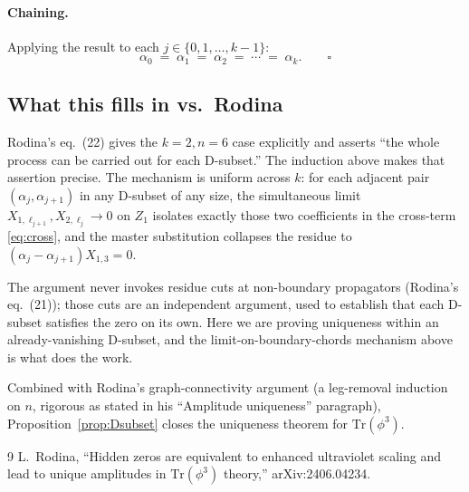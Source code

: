 \documentclass[11pt]{article}
\theoremstyle{definition}
\newcommand{\Tr}{\mathrm{Tr}}
\begin{document}
\paragraph{Chaining.} Applying the result to each $j \in \{0, 1, \dots, k-1\}$:
\[
\alpha_0 \;=\; \alpha_1 \;=\; \alpha_2 \;=\; \cdots \;=\; \alpha_k. \qquad\square
\]

\subsection{What this fills in vs.\ Rodina}

Rodina's eq.~(22) gives the $k=2, n=6$ case explicitly and asserts ``the whole process can be carried out for each D-subset.'' The induction above makes that assertion precise. The mechanism is uniform across $k$: for each adjacent pair $(\alpha_j, \alpha_{j+1})$ in any D-subset of any size, the simultaneous limit $X_{1,\ell_{j+1}}, X_{2,\ell_j} \to 0$ on $Z_1$ isolates exactly those two coefficients in the cross-term \eqref{eq:cross}, and the master substitution collapses the residue to $(\alpha_j - \alpha_{j+1}) X_{1,3} = 0$.

The argument never invokes residue cuts at non-boundary propagators (Rodina's eq.~(21)); those cuts are an independent argument, used to establish that each D-subset satisfies the zero on its own. Here we are proving uniqueness within an already-vanishing D-subset, and the limit-on-boundary-chords mechanism above is what does the work.

Combined with Rodina's graph-connectivity argument (a leg-removal induction on $n$, rigorous as stated in his ``Amplitude uniqueness'' paragraph), Proposition~\ref{prop:Dsubset} closes the uniqueness theorem for $\Tr(\phi^3)$.

\begin{thebibliography}{9}
 L.~Rodina, ``Hidden zeros are equivalent to enhanced ultraviolet scaling and lead to unique amplitudes in $\Tr(\phi^3)$ theory,'' arXiv:2406.04234.
\end{thebibliography}
\end{document}
